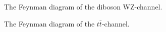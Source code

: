 \begin{figure}
    \centering
    \caption{The Feynman diagram of the diboson WZ-channel.}
\end{figure}

\begin{figure}
    \centering
    \caption{The Feynman diagram of the $t\bar{t}$-channel.}
\end{figure}

